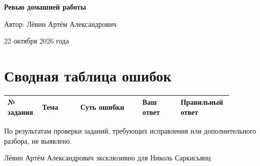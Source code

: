 \documentclass[12pt,a4paper]{article}
\begin{document}
\begin{titlepage}
\thispagestyle{empty}
\hypersetup{pageanchor=false}
\centering
\vspace*{0.31\textheight}
{\LARGE\bfseries Ревью домашней работы\par}
\vspace{18mm}
{\large Автор: Лёвин Артём Александрович\par}
\vspace{6mm}
{\large 22 октября 2026 года\par}
\vfill
{}
\vspace{12mm}
\end{titlepage}
\newpage
\hypersetup{pageanchor=true}
\section*{Сводная таблица ошибок}
\footnotesize
\setlength{\tabcolsep}{3pt}
\begin{tabular}{@{}p{0.14\linewidth}p{0.16\linewidth}p{0.26\linewidth}p{0.16\linewidth}p{0.16\linewidth}@{}}
\toprule
№ задания & Тема & Суть ошибки & Ваш ответ & Правильный ответ \\
\midrule
\bottomrule
\end{tabular}
\normalsize

По результатам проверки заданий, требующих исправления или дополнительного разбора, не выявлено.
\vfill
\begin{center}
\footnotesize Лёвин Артём Александрович эксклюзивно для Николь Саркисьянц
\end{center}
\end{document}
